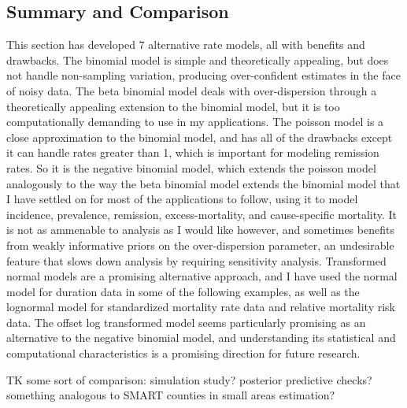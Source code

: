 \subsection{Summary and Comparison}
This section has developed $7$ alternative rate models, all with
benefits and drawbacks.  The binomial model is simple and
theoretically appealing, but does not handle non-sampling variation,
producing over-confident estimates in the face of noisy data.  The
beta binomial model deals with over-dispersion through a theoretically
appealing extension to the binomial model, but it is too
computationally demanding to use in my applications.  The poisson
model is a close approximation to the binomial model, and has all of
the drawbacks except it can handle rates greater than 1, which is
important for modeling remission rates.  So it is the negative
binomial model, which extends the poisson model analogously to the way
the beta binomial model extends the binomial model that I have settled
on for most of the applications to follow, using it to model
incidence, prevalence, remission, excess-mortality, and cause-specific
mortality. It is not as ammenable to analysis as I would like however,
and sometimes benefits from weakly informative priors on the
over-dispersion parameter, an undesirable feature that slows down
analysis by requiring sensitivity analysis.  Transformed normal models
are a promising alternative approach, and I have used the normal model
for duration data in some of the following examples, as well as
the lognormal model for standardized mortality rate data and relative
mortality risk data. The offset log transformed model seems
particularly promising as an alternative to the negative binomial
model, and understanding its statistical and computational
characteristics is a promising direction for future research.

TK some sort of comparison: simulation study? posterior predictive
checks? something analogous to SMART counties in small areas
estimation?
